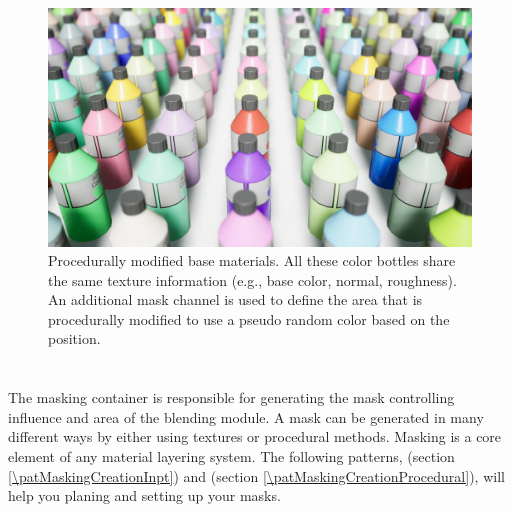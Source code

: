 \begin{figure}
	\centering
	\includegraphics[width=0.7\linewidth]{images/07cha_18_acrilyc_colors.jpg}
	\caption{Procedurally modified base materials. All these color bottles share the same texture information (e.g., base color, normal, roughness). An additional mask channel is used to define the area that is procedurally modified to use a pseudo random color based on the position.}
	\label{fig:acrilyccolors}
\end{figure}



\section{\patCatMaskingContainer}\label{\patCatMaskingContainer}

The masking container is responsible for generating the mask controlling influence and area of the blending module. A mask can be generated in many different ways by either using textures or procedural methods. Masking is a core element of any material layering system. The following patterns, \emph{\patMaskingCreationInpt} (section \ref{\patMaskingCreationInpt}) and \emph{\patMaskingCreationProcedural} (section \ref{\patMaskingCreationProcedural}), will help you planing and setting up your masks. 


